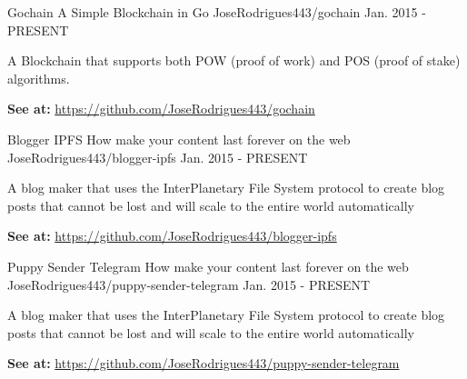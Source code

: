 

\begin{cventries}

  \cventry
    {Gochain} %
    {A Simple Blockchain in Go} %
    {JoseRodrigues443/gochain} %
    {Jan. 2015 - PRESENT} %
    {
      \begin{cvitems} %
        \item {A Blockchain that supports both POW (proof of work) and POS (proof of stake) algorithms.}
        \item {\textbf{See at:} \url{https://github.com/JoseRodrigues443/gochain}}
      \end{cvitems}
    }


  \cventry
    {Blogger IPFS} %
    {How make your content last forever on the web} %
    {JoseRodrigues443/blogger-ipfs} %
    {Jan. 2015 - PRESENT} %
    {
      \begin{cvitems} %
        \item {A blog maker that uses the InterPlanetary File System protocol to create blog posts that cannot be lost and will scale to the entire world automatically}
        \item {\textbf{See at:} \url{https://github.com/JoseRodrigues443/blogger-ipfs}}
      \end{cvitems}
    }


  \cventry
    {Puppy Sender Telegram} %
    {How make your content last forever on the web} %
    {JoseRodrigues443/puppy-sender-telegram} %
    {Jan. 2015 - PRESENT} %
    {
      \begin{cvitems} %
        \item {A blog maker that uses the InterPlanetary File System protocol to create blog posts that cannot be lost and will scale to the entire world automatically}
        \item {\textbf{See at:} \url{https://github.com/JoseRodrigues443/puppy-sender-telegram}}
      \end{cvitems}
    }


\end{cventries}
